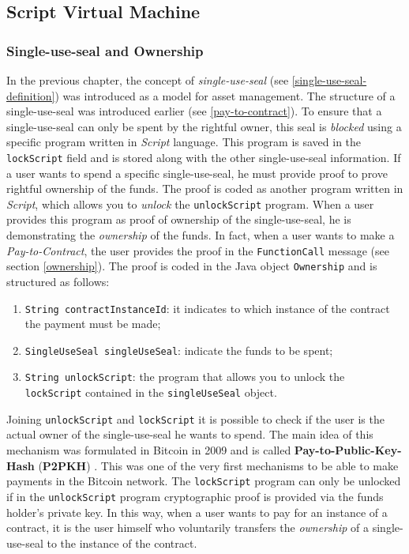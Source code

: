 \subsection{Script Virtual Machine}
\label{script-vm}

\subsubsection{Single-use-seal and Ownership}
\label{single-use-seals-and-ownerships}

In the previous chapter, the concept of \textit{single-use-seal} (see \ref{single-use-seal-definition}) 
was introduced as a model for asset management. The structure of a single-use-seal was introduced earlier 
(see \ref{pay-to-contract}). To ensure that a single-use-seal can only be spent by the rightful owner, 
this seal is \textit{blocked} using a specific program written in \textit{Script} language. This program 
is saved in the \verb|lockScript| field and is stored along with the other single-use-seal information. 
If a user wants to spend a specific single-use-seal, he must provide proof to prove rightful ownership of 
the funds. The proof is coded as another program written in \textit{Script}, which allows you to 
\textit{unlock} the \verb|unlockScript| program. When a user provides this program as proof of ownership 
of the single-use-seal, he is demonstrating the \textit{ownership} of the funds. In fact, when a user 
wants to make a \textit{Pay-to-Contract}, the user provides the proof in the \verb|FunctionCall| message 
(see section \ref{ownership}). The proof is coded in the Java object \verb|Ownership| and is structured 
as follows:
\begin{enumerate}
  \item \verb|String contractInstanceId|: it indicates to which instance of the contract the payment must 
  be made;
  \item \verb|SingleUseSeal singleUseSeal|: indicate the funds to be spent;
  \item \verb|String unlockScript|: the program that allows you to unlock the \verb|lockScript| contained 
  in the \verb|singleUseSeal| object.
\end{enumerate}

Joining \verb|unlockScript| and \verb|lockScript| it is possible to check if the user is the actual owner 
of the single-use-seal he wants to spend. The main idea of this mechanism was formulated in Bitcoin in 
2009 and is called \textbf{Pay-to-Public-Key-Hash} (\textbf{P2PKH}) \autocite{book:mastering-bitcoin}. 
This was one of the very first mechanisms to be able to make payments in the Bitcoin network. The 
\verb|lockScript| program can only be unlocked if in the \verb|unlockScript| program cryptographic proof 
is provided via the funds holder's private key. In this way, when a user wants to pay for an instance of 
a contract, it is the user himself who voluntarily transfers the \textit{ownership} of a single-use-seal 
to the instance of the contract.

